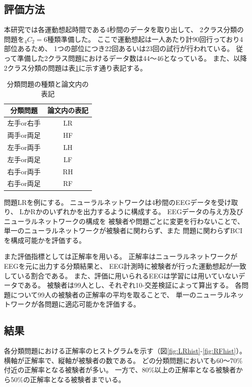 \subsection{\mc 評価方法}
本研究では各運動想起時間である4秒間のデータを取り出して、
2クラス分類の問題を\(_4C_2=6\)種類準備した。
ここで運動想起は一人あたり計90回行っており4部位あるため、
1つの部位につき22回あるいは23回の試行が行われている。
従って準備した2クラス問題におけるデータ数は44〜46となっている。
また、以降2クラス分類の問題は表\ref{table:pattern}に示す通り表記する。
\begin{table}[t]
    \centering
    \caption{分類問題の種類と論文内の表記}
    \begin{tabular}{|c|c|} \hline
        分類問題 & 論文内の表記 \\ \hline
        左手or右手 & LR \\ \hline
        両手or両足 & HF \\ \hline
        左手or両手 & LH \\ \hline
        左手or両足 & LF \\ \hline
        右手or両手 & RH \\ \hline
        右手or両足 & RF \\ \hline
    \end{tabular}
    \label{table:pattern}
\end{table}
問題LRを例にする。
ニューラルネットワークは4秒間のEEGデータを受け取り、
LかRかのいずれかを出力するように構成する。
EEGデータの与え方及びニューラルネットワークの構成を
被験者や問題ごとに変更を行わないことで、
単一のニューラルネットワークが被験者に関わらず、また
問題に関わらずBCIを構成可能かを評価する。

また評価指標としては正解率を用いる。
正解率はニューラルネットワークがEEGを元に出力する分類結果と、
EEG計測時に被験者が行った運動想起が一致している割合である。
また、評価に用いられるEEGは学習には用いていないデータである。
被験者は99人とし、それぞれ10-交差検証によって算出する。
各問題について99人の被験者の正解率の平均を取ることで、
単一のニューラルネットワークが各問題に適応可能かを評価する。





\subsection{\mc 結果}
各分類問題における正解率のヒストグラムを示す（図\ref{fig:LRhist}-\ref{fig:RFhist}）。
横軸が正解率で、縦軸が被験者の数である。
どの分類問題においても60〜70\%付近の正解率となる被験者が多い。
一方で、80\%以上の正解率となる被験者から50\%の正解率となる被験者までいる。

